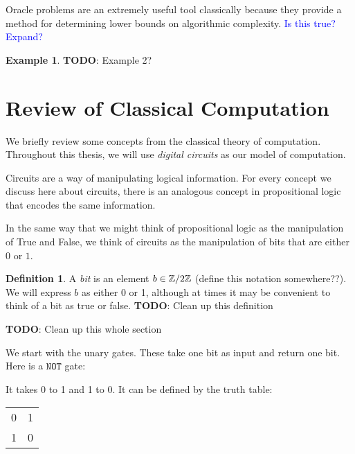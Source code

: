 \documentclass[12pt,twoside]{reedthesis}
\theoremstyle{definition}\newtheorem{definition}{Definition}
\theoremstyle{definition}\newtheorem{example}{Example}
\newcommand{\TODO}[1]{{ \color{red} \textbf{TODO}: {#1}}}
\begin{document}
Oracle problems are an extremely useful tool classically because they provide a method for determining lower bounds on algorithmic complexity. \textcolor{blue}{Is this true? Expand?}


\begin{example}
    \TODO{Example 2?}
\end{example}


\section{Review of Classical Computation}
    We briefly review some concepts from the classical theory of computation. Throughout this thesis, we will use \emph{digital circuits} as our model of computation.

    Circuits are a way of manipulating logical information. For every concept we discuss here about circuits, there is an analogous concept in propositional logic that encodes the same information. 

    In the same way that we might think of propositional logic as the manipulation of True and False, we think of circuits as the manipulation of bits that are either $0$ or $1$.
    \begin{definition}
        A \emph{bit} is an element $b \in \mathbb{Z}/2\mathbb{Z}$ (define this notation somewhere??). We will express $b$ as either 0 or 1, although at times it may be convenient to think of a bit as true or false. \TODO{Clean up this definition}
    \end{definition}

    
    \TODO{Clean up this whole section}

    We start with the unary gates. These take one bit as input and return one bit. Here is a $\texttt{NOT}$ gate:
    \begin{center}
        
    \end{center}

    It takes 0 to 1 and 1 to 0. It can be defined by the truth table:
    \begin{tabular}{l|l}
    0 & 1 \\
    1 & 0
    \end{tabular}
\end{document}
